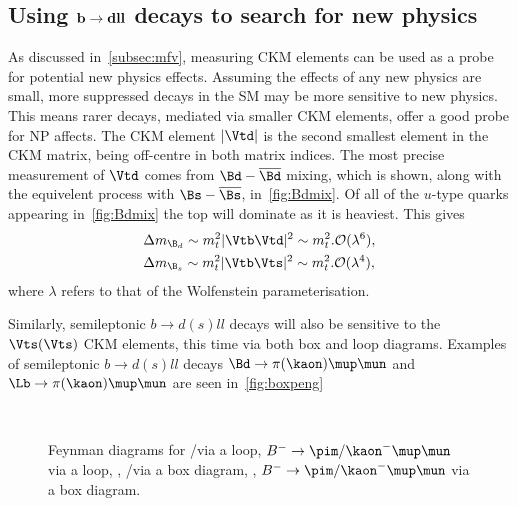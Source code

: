 \subsection{Using $\bf{b\to dll}$ decays to search for new physics}
As discussed in~\autoref{subsec:mfv}, measuring  CKM elements can be used as a probe for potential new physics effects. Assuming the effects of any new physics are small, more suppressed decays in the SM may be more sensitive to new physics. This means rarer decays, mediated via smaller CKM elements, offer a good probe for NP affects. The CKM element $|\Vtd|$ is the second smallest element in the CKM matrix, being off-centre in both matrix indices. The most precise measurement of $\Vtd$ comes from $\Bd-\overline{\Bd}$ mixing, which is shown, along with the equivelent process with $\Bs-\overline{\Bs}$, in~\autoref{fig:Bdmix}.
Of all of the $u$-type quarks appearing in~\autoref{fig:Bdmix} the top will dominate as it is heaviest. This gives
\begin{equation}
  \begin{split}
    & \Delta m_{\B_{d}} \sim m_{t}^{2}|\Vtb\Vtd|^{2} \sim m_{t}^{2}.\mathcal{O}(\lambda^{6}), \\
    & \Delta m_{\B_{s}} \sim m_{t}^{2}|\Vtb\Vts|^{2} \sim m_{t}^{2}.\mathcal{O}(\lambda^{4}),
  \end{split}
\end{equation}
where $\lambda$ refers to that of the Wolfenstein parameterisation.

Similarly, semileptonic $b\to d(s)ll$ decays will also be sensitive to the $\Vts(\Vts)$ CKM elements, this time via both box and loop diagrams. Examples of semileptonic $b\to d(s)ll$ decays $\Bd\to\pi(\kaon)\mup\mun$ and $\Lb\to\pi(\kaon)\mup\mun$ are seen in~\autoref{fig:boxpeng}
\begin{figure}[!h]\def\nh{0.5\textwidth}
  \centering
  \hspace*{-1cm}
  \\
  \hspace*{-1cm}
  \caption{Feynman diagrams for \protect{} \Lb\to\proton\pim/\Km\mup\mun via a loop,  \protect{} $B^{-}\to\pim/\kaon^{-}\mup\mun$ via a loop,  \protect{}, \Lb\to\proton\pim/\Km\mup\mun via a box diagram,
   \protect{}, $B^{-}\to\pim/\kaon^{-}\mup\mun$ via a box diagram.
  }
  \label{fig:boxpeng}
\end{figure}

